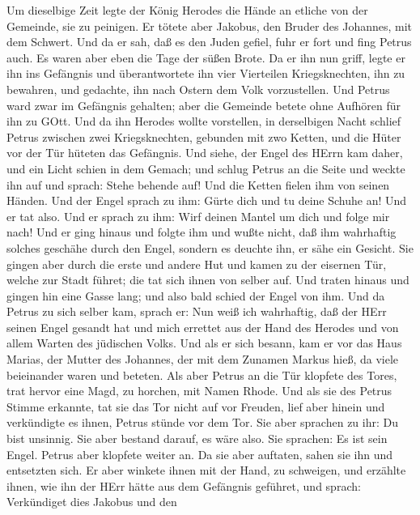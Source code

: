  Um dieselbige Zeit legte der König Herodes die Hände an
etliche von der Gemeinde, sie zu peinigen.  Er tötete aber
Jakobus, den Bruder des Johannes, mit dem Schwert.  Und da
er sah, daß es den Juden gefiel, fuhr er fort und fing Petrus auch. Es
waren aber eben die Tage der süßen Brote.  Da er ihn nun
griff, legte er ihn ins Gefängnis und überantwortete ihn vier Vierteilen
Kriegsknechten, ihn zu bewahren, und gedachte, ihn nach Ostern dem Volk
vorzustellen.  Und Petrus ward zwar im Gefängnis gehalten;
aber die Gemeinde betete ohne Aufhören für ihn zu GOtt.  Und
da ihn Herodes wollte vorstellen, in derselbigen Nacht schlief Petrus
zwischen zwei Kriegsknechten, gebunden mit zwo Ketten, und die Hüter vor
der Tür hüteten das Gefängnis.  Und siehe, der Engel des
HErrn kam daher, und ein Licht schien in dem Gemach; und schlug Petrus
an die Seite und weckte ihn auf und sprach: Stehe behende auf! Und die
Ketten fielen ihm von seinen Händen.  Und der Engel sprach
zu ihm: Gürte dich und tu deine Schuhe an! Und er tat also. Und er
sprach zu ihm: Wirf deinen Mantel um dich und folge mir nach!
 Und er ging hinaus und folgte ihm und wußte nicht, daß ihm
wahrhaftig solches geschähe durch den Engel, sondern es deuchte ihn, er
sähe ein Gesicht.  Sie gingen aber durch die erste und
andere Hut und kamen zu der eisernen Tür, welche zur Stadt führet; die
tat sich ihnen von selber auf. Und traten hinaus und gingen hin eine
Gasse lang; und also bald schied der Engel von ihm.  Und da
Petrus zu sich selber kam, sprach er: Nun weiß ich wahrhaftig, daß der
HErr seinen Engel gesandt hat und mich errettet aus der Hand des Herodes
und von allem Warten des jüdischen Volks.  Und als er sich
besann, kam er vor das Haus Marias, der Mutter des Johannes, der mit dem
Zunamen Markus hieß, da viele beieinander waren und beteten.
 Als aber Petrus an die Tür klopfete des Tores, trat hervor
eine Magd, zu horchen, mit Namen Rhode.  Und als sie des
Petrus Stimme erkannte, tat sie das Tor nicht auf vor Freuden, lief aber
hinein und verkündigte es ihnen, Petrus stünde vor dem Tor.
 Sie aber sprachen zu ihr: Du bist unsinnig. Sie aber
bestand darauf, es wäre also. Sie sprachen: Es ist sein Engel.
 Petrus aber klopfete weiter an. Da sie aber auftaten,
sahen sie ihn und entsetzten sich.  Er aber winkete ihnen
mit der Hand, zu schweigen, und erzählte ihnen, wie ihn der HErr hätte
aus dem Gefängnis geführet, und sprach: Verkündiget dies Jakobus und den
